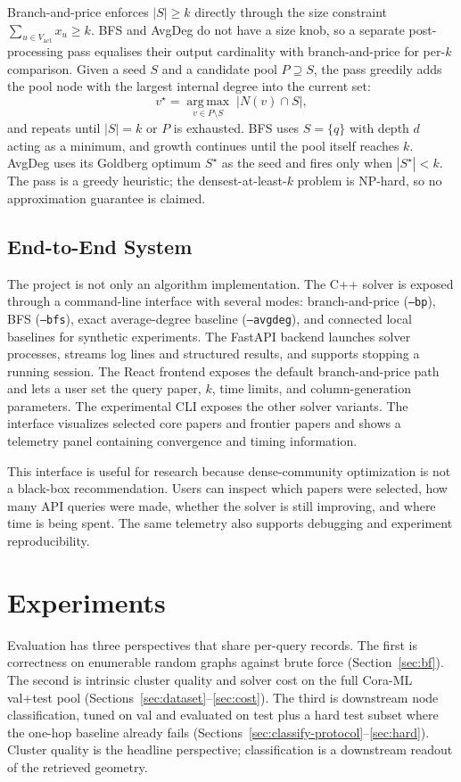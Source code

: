 \documentclass[11pt]{article}
\newcommand{\Vactive}{V_{\mathrm{act}}}
\newcommand{\argmax}{\operatorname*{arg\,max}}
\begin{document}
Branch-and-price enforces $|S| \ge k$ directly through the size constraint
$\sum_{u \in \Vactive} x_u \ge k$. BFS and AvgDeg do not have a size knob,
so a separate post-processing pass equalises their output cardinality with
branch-and-price for per-$k$ comparison. Given a seed $S$ and a candidate
pool $P \supseteq S$, the pass greedily adds the pool node with the
largest internal degree into the current set:
\[
  v^\star = \argmax_{v \in P \setminus S}\; \bigl|N(v) \cap S\bigr|,
\]
and repeats until $|S| = k$ or $P$ is exhausted. BFS uses $S = \{q\}$ with
depth $d$ acting as a minimum, and growth continues until the pool itself
reaches $k$. AvgDeg uses its Goldberg optimum $S^\star$ as the seed and
fires only when $|S^\star| < k$. The pass is a greedy heuristic; the
densest-at-least-$k$ problem is NP-hard, so no approximation guarantee is
claimed.

\subsection{End-to-End System}

The project is not only an algorithm implementation. The C++ solver is exposed
through a command-line interface with several modes: branch-and-price
(\texttt{--bp}), BFS (\texttt{--bfs}), exact average-degree baseline
(\texttt{--avgdeg}), and connected local baselines for synthetic experiments.
The FastAPI backend launches solver processes, streams log lines and structured
results, and supports stopping a running session. The React frontend exposes the
default branch-and-price path and lets a user set the query paper, $k$, time
limits, and column-generation parameters. The experimental CLI exposes the other
solver variants. The interface visualizes selected core papers and frontier
papers and shows a telemetry panel containing convergence and timing
information.

This interface is useful for research because dense-community optimization is
not a black-box recommendation. Users can inspect which papers were selected,
how many API queries were made, whether the solver is still improving, and where
time is being spent. The same telemetry also supports debugging and experiment
reproducibility.

\section{Experiments}

Evaluation has three perspectives that share per-query records. The first
is correctness on enumerable random graphs against brute force
(Section~\ref{sec:bf}). The second is intrinsic cluster quality and
solver cost on the full Cora-ML val+test pool
(Sections~\ref{sec:dataset}--\ref{sec:cost}). The third is downstream
node classification, tuned on val and evaluated on test plus a hard
test subset where the one-hop baseline already fails
(Sections~\ref{sec:classify-protocol}--\ref{sec:hard}). Cluster quality
is the headline perspective; classification is a downstream readout of
the retrieved geometry.
\end{document}
